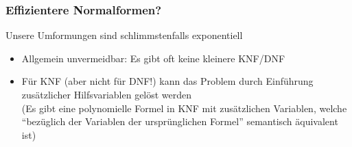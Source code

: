 \documentclass[aspectratio=1610,onlymath]{beamer}
\begin{document}
\begin{frame}\frametitle{Effizientere Normalformen?}

Unsere Umformungen sind schlimmstenfalls exponentiell
\begin{itemize}
\item Allgemein unvermeidbar: Es gibt oft keine kleinere KNF/DNF
\item Für KNF (aber nicht für DNF!) kann das Problem durch Einführung zusätzlicher Hilfsvariablen gelöst werden\\[1ex]
{\tiny (Es gibt eine polynomielle Formel in KNF mit zusätzlichen Variablen, welche\\[-1.5ex] "`bezüglich der Variablen der ursprünglichen Formel"' semantisch äquivalent ist)}
\end{itemize}



\end{frame}
\end{document}
